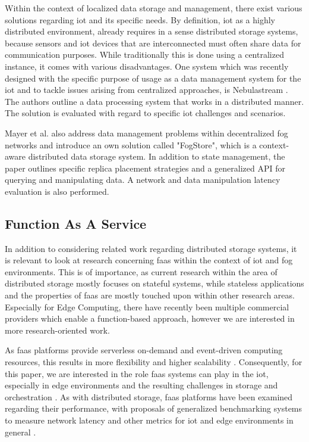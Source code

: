 \documentclass[conference]{IEEEtran}
\begin{document}
Within the context of localized data storage and management, there exist various solutions regarding \ac{iot} and its specific needs. By definition, \ac{iot} as a highly distributed environment, already requires in a sense distributed storage systems, because sensors and \ac{iot} devices that are interconnected must often share data for communication purposes. While traditionally this is done using a centralized instance, it comes with various disadvantages. One system which was recently designed with the specific purpose of usage as a data management system for the \ac{iot} and to tackle issues arising from centralized approaches, is Nebulastream \cite{zeuch2020nebulastream}. The authors outline a data processing system that works in a distributed manner. The solution is evaluated with regard to specific \ac{iot} challenges and scenarios. 

Mayer et al. \cite{fogstore} also address data management problems within decentralized fog networks and introduce an own solution called "FogStore", which is a context-aware distributed data storage system. In addition to state management, the paper outlines specific replica placement strategies and a generalized API for querying and manipulating data. A network and data manipulation latency evaluation is also performed.

\subsection{Function As A Service}\label{Sec:Rel_Faas}
In addition to considering related work regarding distributed storage systems, it is relevant to look at research concerning \ac{faas} within the context of \ac{iot} and fog environments. This is of importance, as current research within the area of distributed storage mostly focuses on stateful systems, while stateless applications and the properties of \ac{faas} are mostly touched upon within other research areas. Especially for Edge Computing, there have recently been multiple commercial providers which enable a function-based approach, however we are interested in more research-oriented work.

As \ac{faas} platforms provide serverless on-demand and event-driven computing resources, this results in more flexibility and higher scalability \cite{Fox2017StatusResearch}. Consequently, for this paper, we are interested in the role \ac{faas} systems can play in the \ac{iot}, especially in edge environments and the resulting challenges in storage and orchestration \cite{Rani2021StorageReview}. As with distributed storage, \ac{faas} platforms have been examined regarding their performance, with proposals of generalized benchmarking systems to measure network latency and other metrics for \ac{iot} and edge environments in general \cite{GrambowBeFaaS:Platforms}.
\end{document}
